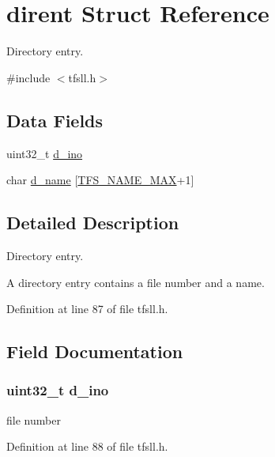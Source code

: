 \hypertarget{structdirent}{}\section{dirent Struct Reference}
\label{structdirent}


Directory entry.  




{\ttfamily \#include $<$tfsll.\+h$>$}

\subsection*{Data Fields}
\begin{DoxyCompactItemize}
\item 
uint32\+\_\+t \hyperlink{structdirent_a5b1ae2e5299876731c54409ebe62e8bf}{d\+\_\+ino}
\item 
char \hyperlink{structdirent_a77ab5fc95e427fce262e6738c6ab02ca}{d\+\_\+name} \mbox{[}\hyperlink{tfsll_8h_a3996311a3e8a2ae3767ab319208b42a7}{T\+F\+S\+\_\+\+N\+A\+M\+E\+\_\+\+M\+A\+X}+1\mbox{]}
\end{DoxyCompactItemize}


\subsection{Detailed Description}
Directory entry. 

A directory entry contains a file number and a name. 

Definition at line 87 of file tfsll.\+h.



\subsection{Field Documentation}
\hypertarget{structdirent_a5b1ae2e5299876731c54409ebe62e8bf}{}
\subsubsection[{d\+\_\+ino}]{\setlength{\rightskip}{0pt plus 5cm}uint32\+\_\+t d\+\_\+ino}\label{structdirent_a5b1ae2e5299876731c54409ebe62e8bf}
file number 

Definition at line 88 of file tfsll.\+h.

\hypertarget{structdirent_a77ab5fc95e427fce262e6738c6ab02ca}{}
